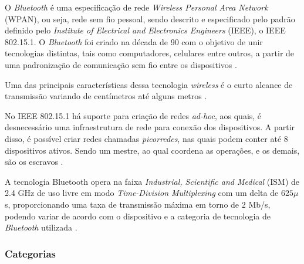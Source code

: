 O \textit{Bluetooth} é uma especificação de rede  \textit{Wireless Personal Area Network} (WPAN), ou seja, rede sem fio pessoal, sendo descrito e especificado pelo padrão definido pelo \textit{{Institute of Electrical and Electronics Engineers}} (IEEE), o IEEE 802.15.1. O \textit{Bluetooth} foi criado na década de 90 com o objetivo de unir tecnologias distintas, tais como computadores, celulares entre outros, a partir de uma padronização de comunicação sem fio entre os dispositivos \cite{Kardach2008}. 




Uma das principais características dessa tecnologia \textit{wireless} é o curto alcance de transmissão variando de centímetros até alguns metros \cite{Huang2007}. 


No IEEE 802.15.1 há suporte para criação de redes \textit{ad-hoc}, aos quais, é desnecessário uma infraestrutura de rede para conexão dos dispositivos. A partir disso, é possível criar redes chamadas \textit{picorredes}, nas quais podem conter até 8 dispositivos ativos. Sendo um mestre, ao qual coordena as operações, e os demais, são os escravos \cite{BluetoothSIG2017, Kurose2012}.

A tecnologia Bluetooth opera na faixa \textit{Industrial, Scientific and Medical} (ISM) de 2.4 GHz de uso livre em modo \textit{Time-Division Multiplexing} com um delta de $625\mu$s, proporcionando uma taxa de transmissão máxima em torno de 2 Mb/s, podendo variar de acordo com o dispositivo e a categoria de tecnologia de \textit{Bluetooth} utilizada \cite{BluetoothSIG2017}.


\ProximoForaDoSumario %
\subsubsection{Categorias}

